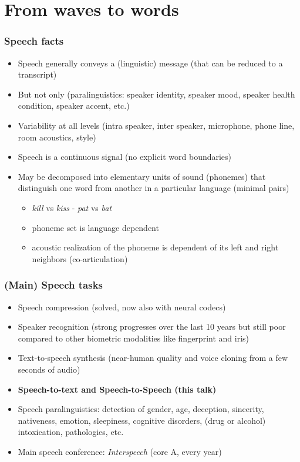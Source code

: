 \documentclass[table]{beamer}
\begin{document}
\frame{\tableofcontents}


\section{From waves to words}

\frame{\tableofcontents[currentsection]}

\begin{frame}
\frametitle{Speech facts}
\begin{itemize}
	\item Speech generally conveys a (linguistic) message (that can be reduced to a transcript)
	\item But not only (paralinguistics: speaker identity, speaker mood, speaker health condition, speaker accent, etc.) 
	\item Variability at all levels (intra speaker, inter speaker, microphone, phone line, room acoustics, style)
	\item Speech is a continuous signal (no explicit word boundaries)
	\item May be decomposed into elementary units of sound (phonemes) that distinguish one word from another in a particular language (minimal pairs)
	\begin{itemize}
		\item \textit{kill} vs \textit{kiss}  -  \textit{pat} vs \textit{bat}  
		\item phoneme set is language dependent
		\item acoustic realization of the phoneme is dependent of its left and right neighbors (co-articulation)
	\end{itemize}
\end{itemize}

\end{frame}




\begin{frame}\frametitle{(Main) Speech tasks}

\begin{itemize}
	\item Speech compression (solved, now also with neural codecs)
	\item Speaker recognition (strong progresses over the last 10 years but still poor compared to other biometric modalities like fingerprint and iris)
	\item Text-to-speech synthesis (near-human quality and voice cloning from a few seconds of audio)
	\item \textbf{Speech-to-text and Speech-to-Speech (this talk)}
	\item Speech paralinguistics: detection of gender, age, deception, sincerity, nativeness, emotion, sleepiness, cognitive disorders, (drug or alcohol) intoxication, pathologies, etc.
	\item Main speech conference: \textit{Interspeech} (core A, every year)
\end{itemize}


\end{frame}
\end{document}
